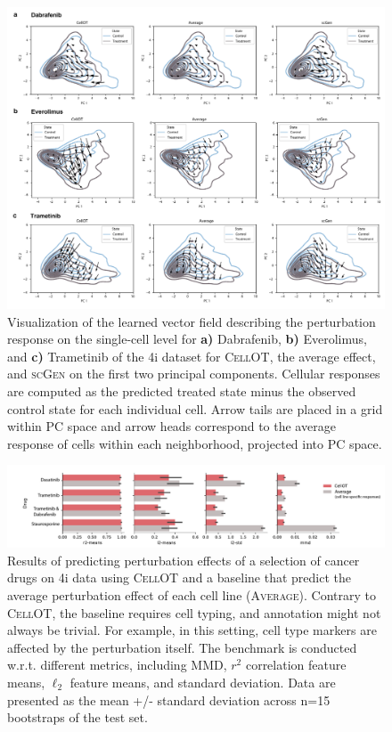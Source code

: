 \begin{figure}[H]
    \centering
    \includegraphics[width=\textwidth]{./figures/cellot-methods/Bunne_ED_Fig2.pdf}
    \caption{Visualization of the learned vector field describing the perturbation response on the single-cell level for \textbf{a)} Dabrafenib, \textbf{b)} Everolimus, and \textbf{c)} Trametinib of the 4i dataset for \textsc{CellOT}, the average effect, and \textsc{scGen} on the first two principal components. Cellular responses are computed as the predicted treated state minus the observed control state for each individual cell. Arrow tails are placed in a grid within PC space and arrow heads correspond to the average response of cells within each neighborhood, projected into PC space.}
    \label{supp_fig:4i_vector_fields}
\end{figure}

\begin{figure}[H]
    \centering
    \includegraphics[width=1.05\textwidth]{figures/cellot-methods/Bunne_Supp_Fig13.pdf}
    \caption{Results of predicting perturbation effects of a selection of cancer drugs on 4i data using \textsc{CellOT} and a baseline that predict the average perturbation effect of each cell line (\textsc{Average}). Contrary to \textsc{CellOT}, the baseline requires cell typing, and annotation might not always be trivial. For example, in this setting, cell type markers are affected by the perturbation itself. The benchmark is conducted w.r.t. different metrics, including MMD, $r^2$ correlation feature means, $\ell_2$ feature means, and standard deviation. Data are presented as the mean +/- standard deviation across n=15 bootstraps of the test set.}
    \label{supp_fig:comparison_cellot_average}
\end{figure}


